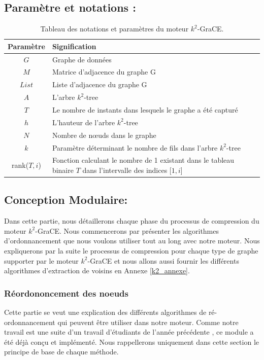 \documentclass[a4paper,oneside,12pt]{report}
\theoremstyle{definition}
\begin{document}
		\subsection{Paramètre et notations :}
				
		\begin{table}[H]
		\centering
		\begin{tabular}{|c|L{12cm}|}
		\hline Paramètre & Signification \\ \hline\hline 
		$G$ & Graphe de données \\ \hline
		$M$ & Matrice d'adjacence du graphe G\\ \hline
		$List$ & Liste d'adjacence du graphe G\\ \hline
		$A$ & L'arbre $k^2$-tree \\\hline
		$T$ & Le nombre de instants dans lesquels le graphe a été capturé \\\hline
		$h$ & L'hauteur de l'arbre $k^2$-tree \\ \hline
		$N$ & Nombre de nœuds dans le graphe \\ \hline
		$k$ & Paramètre déterminant le nombre de fils dans l'arbre $k^2$-tree\\ \hline
		rank($T,i$) &  Fonction calculant le nombre de 1 existant dans le tableau binaire $T$ dans l'intervalle des indices [$1,i$] \\ \hline
		\end{tabular}
		\caption{Tableau des notations et paramètres du moteur $k^2$-GraCE.}	
		\label{notk2grace}		
	\end{table}
	
		\subsection{Conception Modulaire:}
		
		Dans cette partie, nous détaillerons chaque phase du processus de compression du moteur $k^2$-GraCE. Nous commencerons par présenter les algorithmes d'ordonnancement que nous voulons utiliser tout au long avec notre moteur. Nous expliquerons par la suite le processus de compression pour chaque type de graphe supporter par le moteur $k^2$-GraCE et nous allons aussi fournir les différents algorithmes d'extraction de voisins en Annexe \ref{k2_annexe}. 
		
			\subsubsection{Réordononcement des noeuds}
			Cette partie se veut une explication des différents algorithmes de ré-ordonnancement qui peuvent être utiliser dans notre moteur. Comme notre travail est une suite d'un travail d'étudiants de l'année précédente \citep{master2017}, ce module a été déjà conçu et implémenté. Nous rappellerons uniquement dans cette section le principe de base de chaque méthode. 
			
\end{document}
